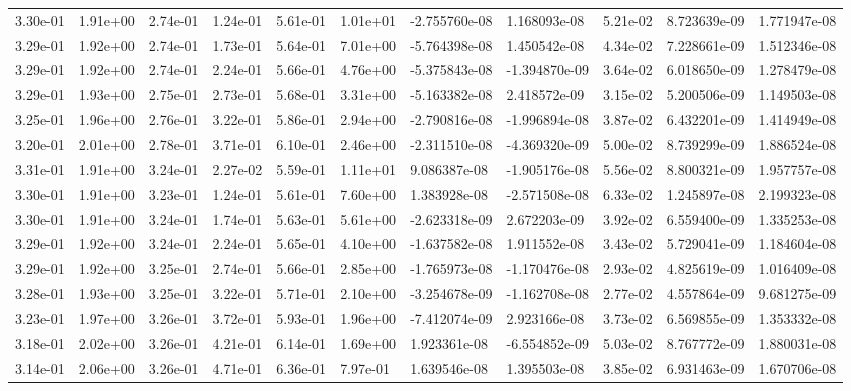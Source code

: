 \begin{longtable}{| p{} | p{} |}
3.30e-01 & 1.91e+00 & 2.74e-01 & 1.24e-01 & 5.61e-01 & 1.01e+01 & -2.755760e-08 &  1.168093e-08 &  5.21e-02 &  8.723639e-09 &  1.771947e-08 \\
3.29e-01 & 1.92e+00 & 2.74e-01 & 1.73e-01 & 5.64e-01 & 7.01e+00 & -5.764398e-08 &  1.450542e-08 &  4.34e-02 &  7.228661e-09 &  1.512346e-08 \\
3.29e-01 & 1.92e+00 & 2.74e-01 & 2.24e-01 & 5.66e-01 & 4.76e+00 & -5.375843e-08 & -1.394870e-09 &  3.64e-02 &  6.018650e-09 &  1.278479e-08 \\
3.29e-01 & 1.93e+00 & 2.75e-01 & 2.73e-01 & 5.68e-01 & 3.31e+00 & -5.163382e-08 &  2.418572e-09 &  3.15e-02 &  5.200506e-09 &  1.149503e-08 \\
3.25e-01 & 1.96e+00 & 2.76e-01 & 3.22e-01 & 5.86e-01 & 2.94e+00 & -2.790816e-08 & -1.996894e-08 &  3.87e-02 &  6.432201e-09 &  1.414949e-08 \\
3.20e-01 & 2.01e+00 & 2.78e-01 & 3.71e-01 & 6.10e-01 & 2.46e+00 & -2.311510e-08 & -4.369320e-09 &  5.00e-02 &  8.739299e-09 &  1.886524e-08 \\
3.31e-01 & 1.91e+00 & 3.24e-01 & 2.27e-02 & 5.59e-01 & 1.11e+01 &  9.086387e-08 & -1.905176e-08 &  5.56e-02 &  8.800321e-09 &  1.957757e-08 \\
3.30e-01 & 1.91e+00 & 3.23e-01 & 1.24e-01 & 5.61e-01 & 7.60e+00 &  1.383928e-08 & -2.571508e-08 &  6.33e-02 &  1.245897e-08 &  2.199323e-08 \\
3.30e-01 & 1.91e+00 & 3.24e-01 & 1.74e-01 & 5.63e-01 & 5.61e+00 & -2.623318e-09 &  2.672203e-09 &  3.92e-02 &  6.559400e-09 &  1.335253e-08 \\
3.29e-01 & 1.92e+00 & 3.24e-01 & 2.24e-01 & 5.65e-01 & 4.10e+00 & -1.637582e-08 &  1.911552e-08 &  3.43e-02 &  5.729041e-09 &  1.184604e-08 \\
3.29e-01 & 1.92e+00 & 3.25e-01 & 2.74e-01 & 5.66e-01 & 2.85e+00 & -1.765973e-08 & -1.170476e-08 &  2.93e-02 &  4.825619e-09 &  1.016409e-08 \\
3.28e-01 & 1.93e+00 & 3.25e-01 & 3.22e-01 & 5.71e-01 & 2.10e+00 & -3.254678e-09 & -1.162708e-08 &  2.77e-02 &  4.557864e-09 &  9.681275e-09 \\
3.23e-01 & 1.97e+00 & 3.26e-01 & 3.72e-01 & 5.93e-01 & 1.96e+00 & -7.412074e-09 &  2.923166e-08 &  3.73e-02 &  6.569855e-09 &  1.353332e-08 \\
3.18e-01 & 2.02e+00 & 3.26e-01 & 4.21e-01 & 6.14e-01 & 1.69e+00 &  1.923361e-08 & -6.554852e-09 &  5.03e-02 &  8.767772e-09 &  1.880031e-08 \\
3.14e-01 & 2.06e+00 & 3.26e-01 & 4.71e-01 & 6.36e-01 & 7.97e-01 &  1.639546e-08 &  1.395503e-08 &  3.85e-02 &  6.931463e-09 &  1.670706e-08 \\

\end{longtable}
